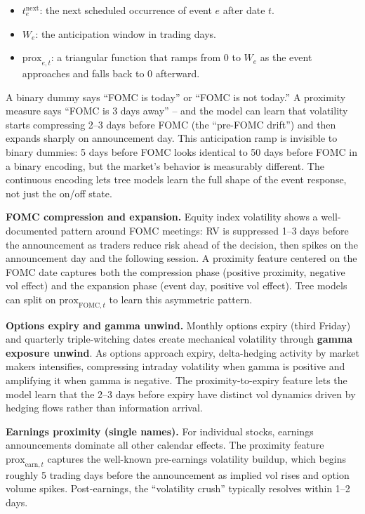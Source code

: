 \begin{itemize}[nosep]
  \item $t_e^{\text{next}}$: the next scheduled occurrence of event $e$ after date $t$.
  \item $W_e$: the anticipation window in trading days.
  \item $\text{prox}_{e,t}$: a triangular function that ramps from 0 to $W_e$ as the event approaches and falls back to 0 afterward.
\end{itemize}

\begin{intuition}
A binary dummy says ``FOMC is today'' or ``FOMC is not today.''
A proximity measure says ``FOMC is 3 days away'' -- and the model can learn that volatility starts compressing 2--3 days before FOMC (the ``pre-FOMC drift'') and then expands sharply on announcement day.
This anticipation ramp is invisible to binary dummies: 5 days before FOMC looks identical to 50 days before FOMC in a binary encoding, but the market's behavior is measurably different.
The continuous encoding lets tree models learn the full shape of the event response, not just the on/off state.
\end{intuition}

\textbf{FOMC compression and expansion.}
Equity index volatility shows a well-documented pattern around FOMC meetings: RV is suppressed 1--3 days before the announcement as traders reduce risk ahead of the decision, then spikes on the announcement day and the following session.
A proximity feature centered on the FOMC date captures both the compression phase (positive proximity, negative vol effect) and the expansion phase (event day, positive vol effect).
Tree models can split on $\text{prox}_{\text{FOMC},t}$ to learn this asymmetric pattern.

\textbf{Options expiry and gamma unwind.}
Monthly options expiry (third Friday) and quarterly triple-witching dates create mechanical volatility through \textbf{gamma exposure unwind}.
As options approach expiry, delta-hedging activity by market makers intensifies, compressing intraday volatility when gamma is positive and amplifying it when gamma is negative.
The proximity-to-expiry feature lets the model learn that the 2--3 days before expiry have distinct vol dynamics driven by hedging flows rather than information arrival.

\textbf{Earnings proximity (single names).}
For individual stocks, earnings announcements dominate all other calendar effects.
The proximity feature $\text{prox}_{\text{earn},t}$ captures the well-known pre-earnings volatility buildup, which begins roughly 5 trading days before the announcement as implied vol rises and option volume spikes.
Post-earnings, the ``volatility crush'' typically resolves within 1--2 days.


